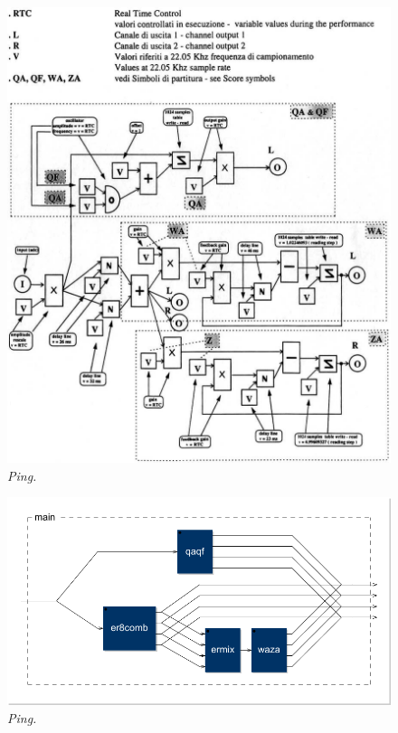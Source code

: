 \documentclass[twoside,a4paper]{article}
\begin{document}
\begin{figure}[ht]
\centerline{\includegraphics[scale=0.5]{img/2-comp}}
\caption{\label{fft_plot}{\it Ping.}}
\end{figure}

\begin{figure}[ht]
\centerline{\includegraphics[scale=0.5]{img/main}}
\caption{\label{fft_plot}{\it Ping.}}
\end{figure}
\end{document}
